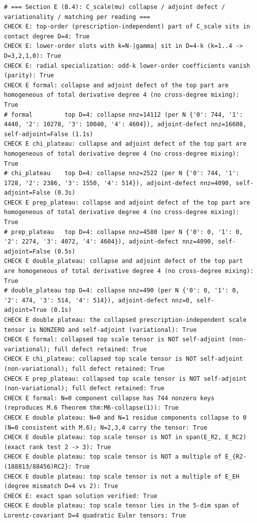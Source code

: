 \documentclass{article}
\theoremstyle{remark}
\begin{document}
\begin{lstlisting}
# === Section E (B.4): C_scale(mu) collapse / adjoint defect / variationality / matching per reading ===
CHECK E: top-order (prescription-independent) part of C_scale sits in contact degree D=4: True
CHECK E: lower-order slots with k=N-|gamma| sit in D=4-k (k=1..4 -> D=3,2,1,0): True
CHECK E: radial specialization: odd-k lower-order coefficients vanish (parity): True
CHECK E formal: collapse and adjoint defect of the top part are homogeneous of total derivative degree 4 (no cross-degree mixing): True
# formal         top D=4: collapse nnz=14112 (per N {'0': 744, '1': 4440, '2': 10278, '3': 10040, '4': 4604}), adjoint-defect nnz=16608, self-adjoint=False (1.1s)
CHECK E chi_plateau: collapse and adjoint defect of the top part are homogeneous of total derivative degree 4 (no cross-degree mixing): True
# chi_plateau    top D=4: collapse nnz=2522 (per N {'0': 744, '1': 1728, '2': 2386, '3': 1550, '4': 514}), adjoint-defect nnz=4090, self-adjoint=False (0.3s)
CHECK E prep_plateau: collapse and adjoint defect of the top part are homogeneous of total derivative degree 4 (no cross-degree mixing): True
# prep_plateau   top D=4: collapse nnz=4580 (per N {'0': 0, '1': 0, '2': 2274, '3': 4072, '4': 4604}), adjoint-defect nnz=4090, self-adjoint=False (0.5s)
CHECK E double_plateau: collapse and adjoint defect of the top part are homogeneous of total derivative degree 4 (no cross-degree mixing): True
# double_plateau top D=4: collapse nnz=490 (per N {'0': 0, '1': 0, '2': 474, '3': 514, '4': 514}), adjoint-defect nnz=0, self-adjoint=True (0.1s)
CHECK E double plateau: the collapsed prescription-independent scale tensor is NONZERO and self-adjoint (variational): True
CHECK E formal: collapsed top scale tensor is NOT self-adjoint (non-variational); full defect retained: True
CHECK E chi_plateau: collapsed top scale tensor is NOT self-adjoint (non-variational); full defect retained: True
CHECK E prep_plateau: collapsed top scale tensor is NOT self-adjoint (non-variational); full defect retained: True
CHECK E formal: N=0 component collapse has 744 nonzero keys (reproduces M.6 Theorem thm:M6-collapse(1)): True
CHECK E double plateau: N=0 and N=1 residue components collapse to 0 (N=0 consistent with M.6); N=2,3,4 carry the tensor: True
CHECK E double plateau: top scale tensor is NOT in span(E_R2, E_RC2) (exact rank test 2 -> 3): True
CHECK E double plateau: top scale tensor is NOT a multiple of E_{R2-(188813/88456)RC2}: True
CHECK E double plateau: top scale tensor is not a multiple of E_EH (degree mismatch D=4 vs 2): True
CHECK E: exact span solution verified: True
CHECK E double plateau: top scale tensor lies in the 5-dim span of Lorentz-covariant D=4 quadratic Euler tensors: True

\end{lstlisting}
\end{document}
